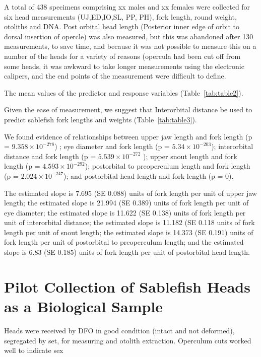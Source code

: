 \documentclass[12pt]{article}\usepackage[]{graphicx}\usepackage[]{color}
\begin{document}
A total of 438 specimens comprising xx males and xx females were collected for six head measurements (UJ,ED,IO,SL, PP, PH), fork length, round weight, otoliths and DNA. Post orbital head length (Posterior inner edge of orbit to dorsal insertion of opercle) was also measured, but this was abandoned after 130 measurements, to save time, and because it was not possible to measure this on a number of the heads for a variety of reasons (opercula had been cut off from some heads, it was awkward to take longer measurements using the electronic calipers, and the end points of the measurement were difficult to define.

The mean values of the predictor and response variables (Table~\ref{tab:table2}).

Given the ease of measurement, we suggest that Interorbital distance be used to predict sablefish fork lengths and weights (Table~\ref{tab:table3}).

We found evidence of relationships between upper jaw length and fork length (p = \ensuremath{9.358\times 10^{-278}}) ; eye diameter and fork length (p = \ensuremath{5.34\times 10^{-203}}); interorbital distance and fork length (p = \ensuremath{5.539\times 10^{-272}} ); upper snout length and fork length (p = \ensuremath{4.593\times 10^{-292}}); postorbital to preoperculum length and fork length (p = \ensuremath{2.024\times 10^{-247}}); and postorbital head length and fork length (p = 0).

The estimated slope is 7.695 (SE 0.088) units of fork length per unit of upper jaw length; the estimated slope is 21.994 (SE 0.389) units of fork length per unit of eye diameter; the estimated slope is 11.622 (SE 0.138) units of fork length per unit of interorbital distance; the estimated slope is 11.182 (SE 0.118 units of fork length per unit of snout length; the estimated slope is 14.373 (SE 0.191) units of fork length per unit of postorbital to preoperculum length; and the estimated slope is 6.83 (SE 0.185) units of fork length per unit of postorbital head length.

\hypertarget{pilot-collection-of-sablefish-heads-as-a-biological-sample}{%
\section{Pilot Collection of Sablefish Heads as a Biological Sample}\label{pilot-collection-of-sablefish-heads-as-a-biological-sample}}

Heads were received by DFO in good condition (intact and not deformed), segregated by set, for measuring and otolith extraction. Operculum cuts worked well to indicate sex
\end{document}
